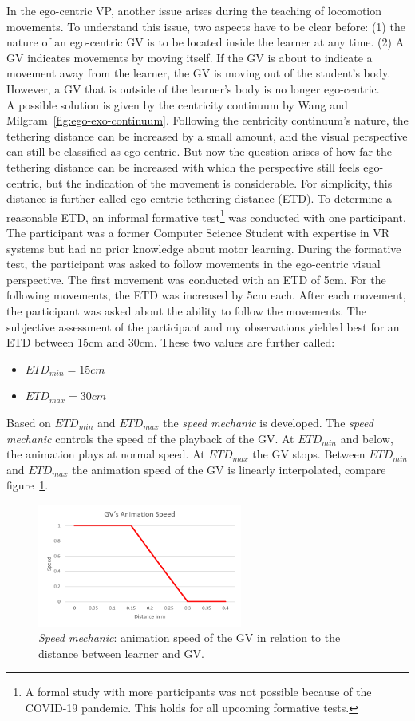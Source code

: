 In the ego-centric VP, another issue arises during the teaching of locomotion movements. To understand this issue, two aspects have to be clear before: (1) the nature of an ego-centric GV is to be located inside the learner at any time. (2) A GV indicates movements by moving itself. If the GV is about to indicate a movement away from the learner, the GV is moving out of the student's body. However, a GV that is outside of the learner's body is no longer ego-centric.\\
A possible solution is given by the centricity continuum by Wang and Milgram~\ref{fig:ego-exo-continuum}. Following the centricity continuum's nature, the tethering distance can be increased by a small amount, and the visual perspective can still be classified as ego-centric. But now the question arises of how far the tethering distance can be increased with which the perspective still feels ego-centric, but the indication of the movement is considerable. For simplicity, this distance is further called ego-centric tethering distance (ETD). To determine a reasonable ETD, an informal formative test\footnote{A formal study with more participants was not possible because of the COVID-19 pandemic. This holds for all upcoming formative tests.} was conducted with one participant. The participant was a former Computer Science Student with expertise in VR systems but had no prior knowledge about motor learning. During the formative test, the participant was asked to follow movements in the ego-centric visual perspective. The first movement was conducted with an ETD of 5cm. For the following movements, the ETD was increased by 5cm each. After each movement, the participant was asked about the ability to follow the movements. The subjective assessment of the participant and my observations yielded best for an ETD between 15cm and 30cm. These two values are further called:
\begin{itemize}
	\item[] $ETD_{min}=15cm$
	\item[] $ETD_{max}=30cm$
\end{itemize}
Based on $ETD_{min}$ and $ETD_{max}$ the \textit{speed mechanic} is developed. The \textit{speed mechanic} controls the speed of the playback of the GV. At $ETD_{min}$ and below, the animation plays at normal speed. At $ETD_{max}$ the GV stops. Between $ETD_{min}$ and $ETD_{max}$ the animation speed of the GV is linearly interpolated, compare figure~\ref{fig:speed_mechanic}.
\begin{figure}[htb]
	\centering
	\includegraphics[width=0.6\textwidth]{figures/speed_mechanic_chart.png}
	\caption[Animation speed for the \textit{Speed mechanic}]{\textit{Speed mechanic}: animation speed of the GV in relation to the distance between learner and GV.}
	\label{fig:speed_mechanic}
\end{figure}
